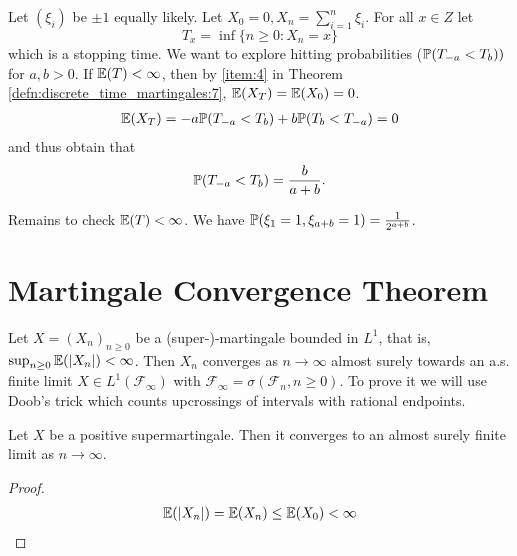Let $(\xi_{i})$ be \iid $\pm 1$ equally likely. Let $X_{0} = 0, X_{n} =
\sum_{i=1}^{n} \xi_{i}$.  For all $x \in Z$ let
\begin{equation}
  \label{eq:32}
  T_{x} = \inf \{ n \geq 0 : X_{n} = x \}
\end{equation} which is a stopping time. We want to explore hitting
probabilities ($\Prob{T_{-a} < T_{b}})$ for $a, b > 0$.
If $\E{T} < \infty$, then by \ref{item:4} in Theorem
\ref{defn:discrete_time_martingales:7}, $\E{X_{T}} = \E{X_{0}} = 0$.
\begin{align}
  \label{eq:33}
  \E{X_{T}} = -a \Prob{T_{-a} < T_{b}} + b \Prob{T_{b} < T_{-a}} = 0
\end{align} and thus obtain that
\begin{equation}
  \label{eq:34}
  \Prob{T_{-a} < T_{b}} = \frac{b}{a+b}.
\end{equation}

Remains to check $\E{T} < \infty$.  We have $\Prob{\xi_{1} = 1,
  \xi_{a+b} = 1} = \frac{1}{2^{a+b}}$.

\section{Martingale Convergence Theorem}
\label{sec:mart-conv-theor}

\begin{thm}
  \label{defn:discrete_time_martingales:9}
  Let $X = (X_{n})_{n \geq 0}$ be a (super-)-martingale bounded in
  $L^{1}$, that is, $\sup_{n \geq 0} \E{|X_{n}|} < \infty$.  Then
  $X_{n}$ converges as $n \rightarrow \infty$ almost surely towards an
  a.s. finite limit $X \in L^{1}(\mathcal{F}_{\infty})$ with
  $\mathcal{F}_{\infty} = \sigma(\mathcal{F}_{n}, n \geq 0)$.  To
  prove it we will use Doob's trick which counts upcrossings of
  intervals with rational endpoints. 
\end{thm}

\begin{corollary}
  Let $X$ be a positive supermartingale.  Then it converges to an
  almost surely finite limit as $n \rightarrow \infty$.
\end{corollary}

\begin{proof}
  \begin{align}
    \label{eq:36}
    \E{|X_{n}|} = \E{X_{n}} \leq \E{X_{0}} < \infty
  \end{align}
\end{proof}

